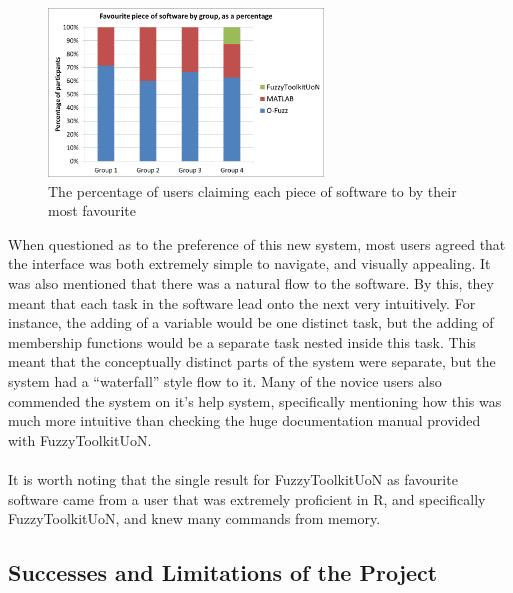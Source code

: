 \begin{figure}[ht!]
	\begin{center}
		\includegraphics[width=0.65\textwidth]{images/mostFav.png}
	\end{center}
	\vspace{-5mm}
	\captionsetup{justification=centering,margin=2cm}	
	\caption{The percentage of users claiming each piece of software to by their most favourite}
	\label{fig:mostLiked}
	\vspace{-2mm}
\end{figure}
\noindent 
When questioned as to the preference of this new system, most users agreed that the interface was both extremely simple to navigate, and visually appealing. It was also mentioned that there was a natural flow to the software. By this, they meant that each task in the software lead onto the next very intuitively. For instance, the adding of a variable would be one distinct task, but the adding of membership functions would be a separate task nested inside this task. This meant that the conceptually distinct parts of the system were separate, but the system had a ``waterfall'' style flow to it. Many of the novice users also commended the system on it's help system, specifically mentioning how this was much more intuitive than checking the huge documentation manual provided with FuzzyToolkitUoN.\ \\
\ \\
It is worth noting that the single result for FuzzyToolkitUoN as favourite software came from a user that was extremely proficient in R, and specifically FuzzyToolkitUoN, and knew many commands from memory. 
	

\subsection{Successes and Limitations of the Project}

